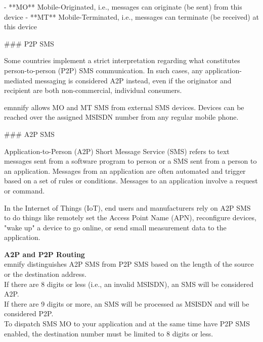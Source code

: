 \documentclass[11pt, oneside]{article}   	%
\newcommand{\addspace}{\vspace{2mm}}
\begin{document}
\addspace
\begin{markdown}
- **MO** Mobile-Originated, i.e., messages can originate (be sent) from this device
- **MT** Mobile-Terminated, i.e., messages can terminate (be received) at this device
\end{markdown}
\addspace
\begin{markdown}

### P2P SMS

Some countries implement a strict interpretation regarding what constitutes person-to-person (P2P) SMS communication.
In such cases, any application-mediated messaging is considered A2P instead, even if the originator and recipient are both non-commercial, individual consumers.

emnnify allows MO and MT SMS from external SMS devices.
Devices can be reached over the assigned MSISDN number from any regular mobile phone.

### A2P SMS

Application-to-Person (A2P) Short Message Service (SMS) refers to text messages sent from a software program to person or a SMS sent from a person to an application. Messages from an application are often automated and trigger based on a set of rules or conditions.
Messages to an application involve a request or command.

In the Internet of Things (IoT), end users and manufacturers rely on A2P SMS to do things like remotely set the Access Point Name (APN), reconfigure devices, "wake up" a device to go online, or send small measurement data to the application.

\end{markdown}

\begin{tcolorbox}[colback=blue!5!white,colframe=blue!75!black,title=Note]
\textbf{A2P and P2P Routing}\\
emnify distinguishes A2P SMS from P2P SMS based on the length of the source or the destination address.\\
If there are 8 digits or less (i.e., an invalid MSISDN), an SMS will be considered A2P.\\
If there are 9 digits or more, an SMS will be processed as MSISDN and will be considered P2P.\\
To dispatch SMS MO to your application and at the same time have P2P SMS enabled, the destination number must be limited to 8 digits or less.
\end{tcolorbox}
\end{document}
